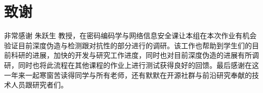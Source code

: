 \chapter{致谢}

非常感谢 朱跃生 教授，在密码编码学与网络信息安全课让本组在本次作业有机会验证目前深度伪造与检测跟对抗性的部分进行的调研。该工作也帮助到学生们的目前科研的进展，加快的开发与研究工作进度，同时也对目前深度伪造的进展有所调研，同时也将此流程在其他课程的作业上进行测试获得良好的回馈。最后感谢在这一年来一起寒窗苦读得同学与所有老师，还有默默在开源社群与前沿研究奉献的技术人员跟研究者们。